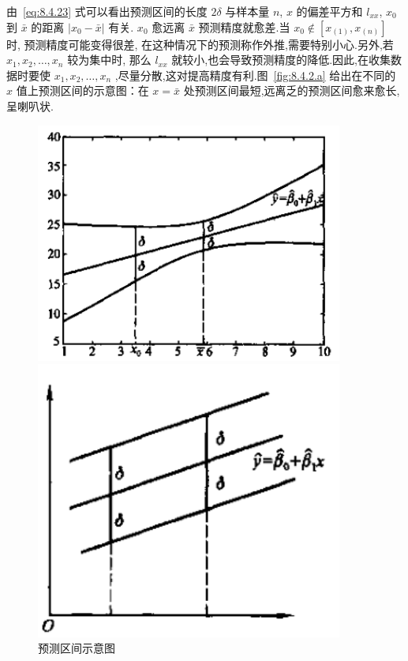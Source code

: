 由~\eqref{eq:8.4.23} 式可以看出预测区间的长度 $2\delta$ 与样本量 $n$, $x$ 的偏差平方和 $l_{xx}$, $x_0$ 到 $\bar{x}$ 的距离 $|x_0 - \bar{x}|$ 有关. $x_0$ 愈远离 $\bar{x}$ 预测精度就愈差.当 $x_0 \notin [x_{(1)},x_{(n)}]$ 时, 预测精度可能变得很差, 在这种情况下的预测称作外推,需要特别小心.另外,若 $x_{1}, x_{2}, \ldots, x_{n}$ 较为集中时, 那么 $l_{xx}$ 就较小,也会导致预测精度的降低.因此,在收集数据时要使 $x_{1}, x_{2}, \ldots, x_{n}$ ,尽量分散,这对提高精度有利.图~\ref{fig:8.4.2.a}
给出在不同的 $x$ 值上预测区间的示意图：在 $x=\bar{x}$ 处预测区间最短,远离乏的预测区间愈来愈长,呈喇叭状.
\begin{figure}[htb!]
    \begin{minipage}[b]{0.5\textwidth}
        \centering
        \includegraphics[width=0.9\textwidth]{figure/8-4-2-1.png}
    \end{minipage}
    \begin{minipage}[b]{0.45\textwidth}
        \centering
        \includegraphics[width=0.9\textwidth]{figure/8-4-2-2.png}
    \end{minipage}
    \caption{预测区间示意图}\label{fig:8.4.2}
\end{figure}

